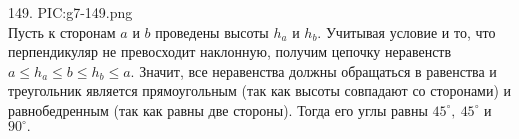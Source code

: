 149. {{PIC:g7-149.png}}\\
Пусть к сторонам $a$ и $b$ проведены высоты $h_a$ и $h_b.$ Учитывая условие и то, что перпендикуляр не превосходит наклонную, получим цепочку неравенств $a\leqslant h_a\leqslant b \leqslant h_b \leqslant a.$ Значит, все неравенства должны обращаться в равенства и треугольник является прямоугольным (так как высоты совпадают со сторонами) и равнобедренным (так как равны две стороны). Тогда его углы равны $45^\circ,\ 45^\circ$ и $90^\circ.$\\
